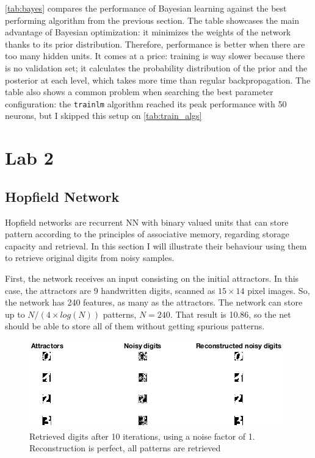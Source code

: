 \documentclass[a4paper, 10pt]{article}
\begin{document}
    \autoref{tab:bayes} compares the performance of Bayesian learning against the 
    best performing algorithm from the previous section. The table showcases the
    main advantage of Bayesian optimization: it minimizes the weights of the
    network thanks to its prior distribution. Therefore, performance is better
    when there are too many hidden units. It comes at a price: training is way slower
    because there is no validation set; it calculates the probability distribution
    of the prior and the posterior at each level, which takes more time than regular
    backpropagation. The table also shows a common problem when searching the best
    parameter configuration: the \texttt{trainlm} algorithm reached its peak 
    performance with 50 neurons, but I skipped this setup on \autoref{tab:train_algs}




  





\newpage
\section{Lab 2}
  \subsection{Hopfield Network}
  Hopfield networks are recurrent NN with binary valued units that can store
  pattern according to the principles of associative memory, regarding storage
  capacity and retrieval. In this section I will illustrate their behaviour using
  them to retrieve original digits from noisy samples.

  First, the network receives an input consisting on the initial attractors. 
  In this case, the attractors are 9 handwritten digits, scanned as $15\times14$
  pixel images. So, the network has 240 features, as many as the attractors.
  The network can store up to $N / (4 \times log(N))$ patterns, $N = 240$. That
  result is 10.86, so the net should be able to store all of them without
  getting spurious patterns.
  \begin{figure}[h]
    \centering
    \includegraphics[width=0.6\linewidth]{lab2/digits/n1i20.png}
    \caption{Retrieved digits after 10 iterations, using a noise factor of 1. 
    Reconstruction is perfect, all patterns are retrieved}
    \label{fig:l2_no_noise}
  \end{figure}
\end{document}
